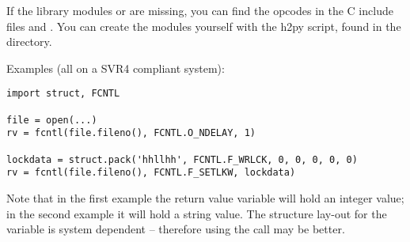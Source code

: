 If the library modules  or  are missing, you
can find the opcodes in the C include files  and
. You can create the modules yourself with the h2py
script, found in the  directory.

Examples (all on a SVR4 compliant system):

\begin{verbatim}
import struct, FCNTL

file = open(...)
rv = fcntl(file.fileno(), FCNTL.O_NDELAY, 1)

lockdata = struct.pack('hhllhh', FCNTL.F_WRLCK, 0, 0, 0, 0, 0)
rv = fcntl(file.fileno(), FCNTL.F_SETLKW, lockdata)
\end{verbatim}
%
Note that in the first example the return value variable  will
hold an integer value; in the second example it will hold a string
value.  The structure lay-out for the  variable is
system dependent -- therefore using the  call may be
better.
